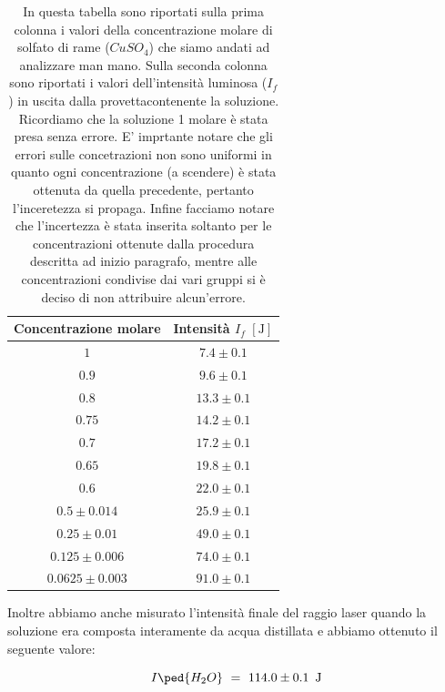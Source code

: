 \begin{table}[t!]
    \centering
    \begin{tabular}{c c }
        \toprule
         Concentrazione molare & Intensità $I_f \,\, [\si{\joule}]$ \\
        \midrule
		$1$ 	& $7.4 \pm 0.1$ \\
		$0.9$ 	& $9.6 \pm 0.1$ \\       
        $0.8$ 	& $13.3 \pm 0.1$ \\
        $0.75$ 	& $14.2 \pm 0.1$ \\
        $0.7$ 	& $17.2 \pm 0.1$ \\
        $0.65$ 	& $19.8 \pm 0.1$ \\
        $0.6$ 	& $22.0 \pm 0.1$ \\
        $0.5 \pm 0.014$ 	& $25.9 \pm 0.1$ \\
        $0.25 \pm 0.01$ 	& $49.0 \pm 0.1$ \\
        $0.125 \pm 0.006$ & $74.0 \pm 0.1$ \\
        $0.0625 \pm 0.003$ & $91.0 \pm 0.1$ \\
        \bottomrule
    \end{tabular}
    \caption{In questa tabella sono riportati sulla prima colonna i valori della concentrazione molare di solfato di rame ($CuSO_4$) che siamo andati ad analizzare man mano. Sulla seconda colonna sono riportati i valori dell'intensità luminosa ($I_f$) in uscita dalla provettacontenente la soluzione. Ricordiamo che la soluzione 1 molare è stata presa senza errore. E' imprtante notare che gli errori sulle concetrazioni non sono uniformi in quanto ogni concentrazione (a scendere) è stata ottenuta da quella precedente, pertanto l'inceretezza si propaga. Infine facciamo notare che l'incertezza è stata inserita soltanto per le concentrazioni ottenute dalla procedura descritta ad inizio paragrafo, mentre alle concentrazioni condivise dai vari gruppi si è deciso di non attribuire alcun'errore.}
    \label{tab:dati}
\end{table}
%
Inoltre abbiamo anche misurato l'intensità finale del raggio laser quando la soluzione era composta interamente da acqua distillata e abbiamo ottenuto il seguente valore:

\begin{equation*}
	I\ped{H_2O} \,\,=\,\, 114.0 \pm 0.1 \,\,\, \si{\joule}
\end{equation*}

